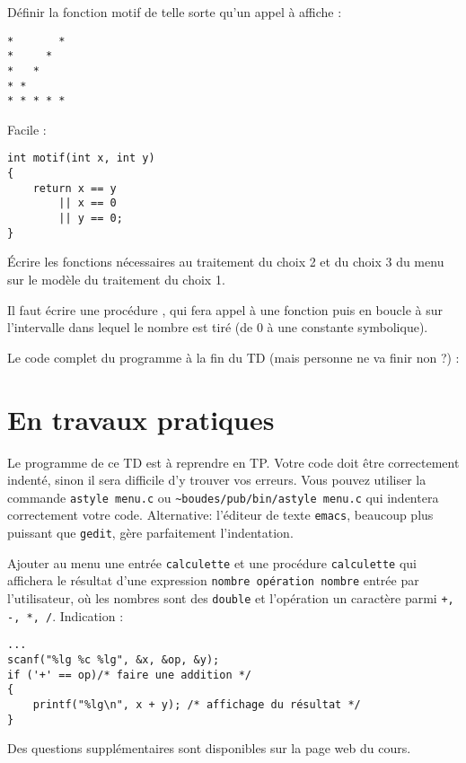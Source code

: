 \begin{lastenu}
  \item Définir la fonction motif de telle sorte qu'un appel à      affiche :
{\footnotesize
\begin{verbatim}
*       * 
*     *   
*   *     
* *       
* * * * * 
\end{verbatim}
}

\begin{correction}
Facile : 
{\footnotesize
\begin{verbatim}
int motif(int x, int y)
{
    return x == y
        || x == 0
        || y == 0;
}
\end{verbatim}
}
\end{correction}

  \item Écrire les fonctions nécessaires au traitement du choix 2 et
    du choix 3 du menu sur le modèle du traitement du choix 1.

\begin{correction}
Il faut écrire une procédure , qui fera appel à une fonction  puis en boucle à  sur l'intervalle dans lequel le nombre est tiré (de 0 à une constante symbolique).

Le code complet du programme à la fin du TD (mais personne ne va finir non ?) :
{\footnotesize
{}
}

\end{correction}
\end{lastenu}

\section{En travaux pratiques}
Le programme de ce TD est à reprendre en TP.  Votre code doit être correctement indenté, sinon il sera
difficile d'y trouver vos erreurs. Vous pouvez utiliser la commande
\verb|astyle menu.c| ou \verb|~boudes/pub/bin/astyle menu.c| qui
indentera correctement votre code. Alternative:
l'éditeur de texte \verb|emacs|, beaucoup plus puissant que
\verb|gedit|, gère parfaitement l'indentation. 

Ajouter au menu une entrée \verb|calculette| et une 
procédure \verb|calculette| qui affichera le résultat d'une 
expression \verb|nombre opération nombre| entrée par l'utilisateur, où les nombres
sont des \verb|double| et l'opération un caractère parmi
\verb|+, -, *, /|.  Indication :
{\footnotesize
\begin{verbatim}
...
scanf("%lg %c %lg", &x, &op, &y);
if ('+' == op)/* faire une addition */
{
    printf("%lg\n", x + y); /* affichage du résultat */
}
\end{verbatim}
}
Des questions supplémentaires sont disponibles sur la
page web du cours.
